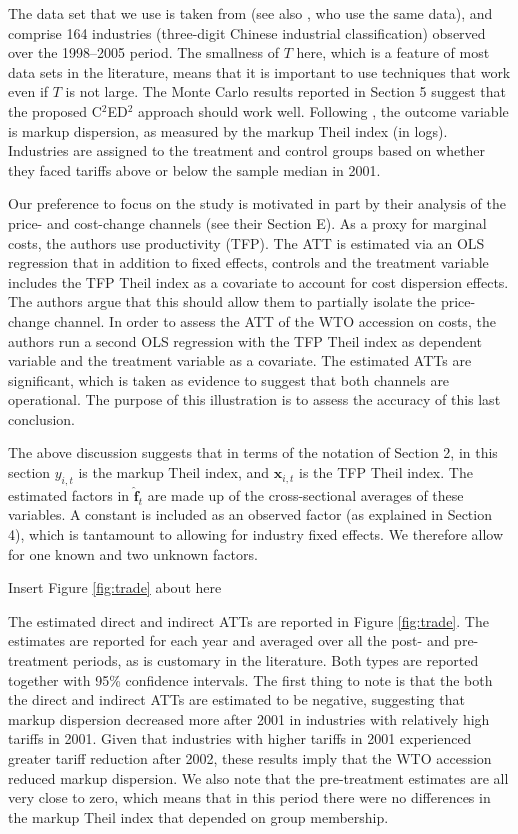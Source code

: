 \documentclass[12pt,fleqn]{article}
\def\*#1{\mathbf{#1}}
\begin{document}
The data set that we use is taken from \citet{lu2015trade} (see also \citealp{Deng_etal_2018}, who use the same data), and comprise 164 industries (three-digit Chinese industrial classification) observed over the 1998--2005 period. The smallness of $T$ here, which is a feature of most data sets in the literature, means that it is important to use techniques that work even if $T$ is not large. The Monte Carlo results reported in Section 5 suggest that the proposed C$^2$ED$^2$ approach should work well. Following \citet{lu2015trade}, the outcome variable is markup dispersion, as measured by the markup Theil index (in logs). Industries are assigned to the treatment and control groups based on whether they faced tariffs above or below the sample median in 2001.

Our preference to focus on the \citet{lu2015trade} study is motivated in part by their analysis of the price- and cost-change channels (see their Section E). As a proxy for marginal costs, the authors use productivity (TFP). The ATT is estimated via an OLS regression that in addition to fixed effects, controls and the treatment variable includes the TFP Theil index as a covariate to account for cost dispersion effects. The authors argue that this should allow them to partially isolate the price-change channel. In order to assess the ATT of the WTO accession on costs, the authors run a second OLS regression with the TFP Theil index as dependent variable and the treatment variable as a covariate. The estimated ATTs are significant, which is taken as evidence to suggest that both channels are operational. The purpose of this illustration is to assess the accuracy of this last conclusion.

The above discussion suggests that in terms of the notation of Section 2, in this section $y_{i,t}$ is the markup Theil index, and $\*x_{i,t}$ is the TFP Theil index. The estimated factors in $\widehat{\*f}_t$ are made up of the cross-sectional averages of these variables. A constant is included as an observed factor (as explained in Section 4), which is tantamount to allowing for industry fixed effects. We therefore allow for one known and two unknown factors.

\begin{center}
{\sc Insert Figure \ref{fig:trade} about here}
\end{center}

The estimated direct and indirect ATTs are reported in Figure \ref{fig:trade}. The estimates are reported for each year and averaged over all the post- and pre-treatment periods, as is customary in the literature. Both types are reported together with 95\% confidence intervals. The first thing to note is that the both the direct and indirect ATTs are estimated to be negative, suggesting that markup dispersion decreased more after 2001 in industries with relatively high tariffs in 2001. Given that industries with higher tariffs in 2001 experienced greater tariff reduction after 2002, these results imply that the WTO accession reduced markup dispersion. We also note that the pre-treatment estimates are all very close to zero, which means that in this period there were no differences in the markup Theil index that depended on group membership.
\end{document}
